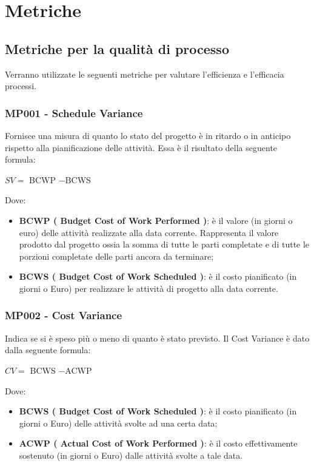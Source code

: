 \chapter{Metriche}
\section{Metriche per la qualità di processo}\label{processo}
Verranno utilizzate le seguenti metriche per valutare l'efficienza e l'efficacia 
processi.

\subsection{MP001 - Schedule Variance}
Fornisce una misura di quanto lo stato del progetto è in ritardo o in anticipo rispetto alla pianificazione delle attività.
Essa è il risultato della seguente formula:\\
\begin{center}
	$SV = ${ BCWP} $-${BCWS}
\end{center}
Dove:
\begin{itemize}
		\item \textbf{ BCWP ( Budget Cost of Work Performed )}: è il valore (in giorni o euro) delle attività realizzate alla data corrente. Rappresenta il valore prodotto dal progetto ossia la somma di tutte le parti completate e di tutte le porzioni completate delle parti ancora da terminare;
		\item \textbf{ BCWS ( Budget Cost of Work Scheduled )}: è il costo pianificato (in giorni o Euro) per realizzare le attività di progetto alla data corrente.
\end{itemize}

\subsection{MP002 - Cost  Variance }
Indica se si è speso più o meno di quanto è stato previsto.
Il Cost Variance è dato dalla seguente formula:\\
\begin{center}
	$CV = ${ BCWS} $-${ACWP}
\end{center}
Dove:
\begin{itemize}
	\item \textbf{ BCWS ( Budget Cost of Work Scheduled )}: è il costo pianificato (in giorni o Euro) delle attività svolte ad una certa data; 
	\item \textbf{ ACWP ( Actual Cost of Work Performed )}: è il costo effettivamente sostenuto (in giorni o Euro) dalle attività svolte a tale data.
\end{itemize}

